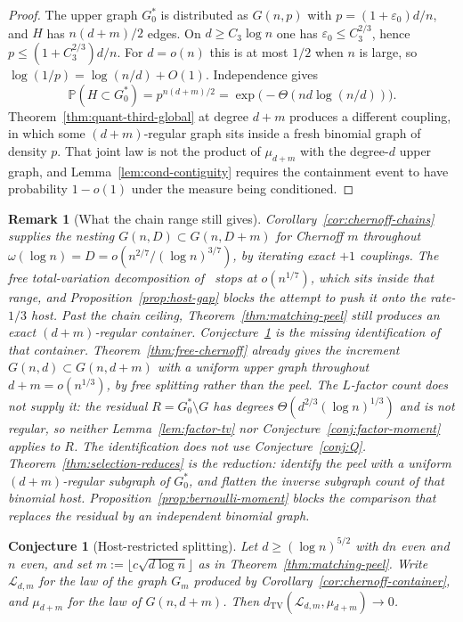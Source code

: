 \documentclass[11pt]{article}
\newtheorem{remark}[theorem]{Remark}
\newtheorem{conjecture}[theorem]{Conjecture}
\newcommand{\PP}{\mathbb{P}}
\newcommand{\dTV}{d_{\mathrm{TV}}}
\begin{document}
\begin{proof}
The upper graph \(G^*_0\) is distributed as \(G(n,p)\) with \(p=(1+\varepsilon_0)d/n\),
and \(H\) has \(n(d+m)/2\) edges.
On \(d\ge C_3\log n\) one has \(\varepsilon_0\le C_3^{2/3}\), hence
\(p\le(1+C_3^{2/3})d/n\).
For \(d=o(n)\) this is at most \(1/2\) when \(n\) is large, so
\(\log(1/p)=\log(n/d)+O(1)\).
Independence gives
\[
\PP(H\subset G^*_0)
=p^{n(d+m)/2}
=\exp\bigl(-\Theta(nd\log(n/d))\bigr).
\]
Theorem~\ref{thm:quant-third-global} at degree \(d+m\) produces a different coupling,
in which some \((d+m)\)-regular graph sits inside a fresh binomial graph of density
\(p\). That joint law is not the product of \(\mu_{d+m}\) with the degree-\(d\) upper
graph, and Lemma~\ref{lem:cond-contiguity} requires the containment event to have
probability \(1-o(1)\) under the measure being conditioned.
\end{proof}

\begin{remark}[What the chain range still gives]
\label{rem:chain-vs-split}
Corollary~\ref{cor:chernoff-chains} supplies the nesting
\(G(n,D)\subset G(n,D+m)\) for Chernoff \(m\) throughout
\(\omega(\log n)=D=o(n^{2/7}/(\log n)^{3/7})\), by iterating exact \(+1\) couplings.
The free total-variation decomposition of~\cite{CFG25} stops at \(o(n^{1/7})\), which
sits inside that range, and Proposition~\ref{prop:host-gap} blocks the attempt to
push it onto the rate-\(1/3\) host.
Past the chain ceiling, Theorem~\ref{thm:matching-peel} still produces an exact
\((d+m)\)-regular container. Conjecture~\ref{conj:config-split} is the missing
identification of that container.
Theorem~\ref{thm:free-chernoff} already gives the increment \(G(n,d)\subset G(n,d+m)\) with a uniform upper graph throughout \(d+m=o(n^{1/3})\), by free splitting rather than the peel.
The \(L\)-factor count does not supply it: the residual \(R=G^*_0\setminus G\) has degrees \(\Theta(d^{2/3}(\log n)^{1/3})\) and is not regular, so neither Lemma~\ref{lem:factor-tv} nor Conjecture~\ref{conj:factor-moment} applies to \(R\).
The identification does not use Conjecture~\ref{conj:Q}.
Theorem~\ref{thm:selection-reduces} is the reduction: identify the peel with a uniform \((d+m)\)-regular subgraph of \(G^*_0\), and flatten the inverse subgraph count of that binomial host.
Proposition~\ref{prop:bernoulli-moment} blocks the comparison that replaces the residual by an independent binomial graph.
\end{remark}

\begin{conjecture}[Host-restricted splitting]
\label{conj:config-split}
Let \(d\ge(\log n)^{5/2}\) with \(dn\) even and \(n\) even, and set
\(m:=\lfloor c\sqrt{d\log n}\rfloor\) as in Theorem~\ref{thm:matching-peel}.
Write \(\mathcal{L}_{d,m}\) for the law of the graph \(G_m\) produced by
Corollary~\ref{cor:chernoff-container}, and \(\mu_{d+m}\) for the law of
\(G(n,d+m)\).
Then \(\dTV(\mathcal{L}_{d,m},\mu_{d+m})\to 0\).
\end{conjecture}
\end{document}
